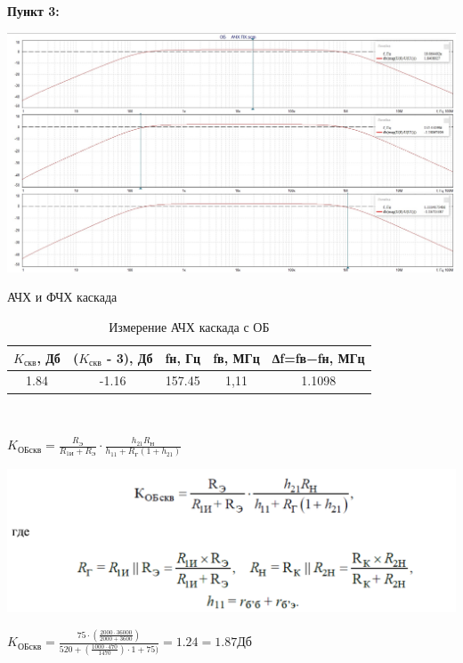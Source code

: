 \documentclass[a4paper,14pt]{extarticle}
\begin{document}
    \newpage 
    \textbf{Пункт 3:}
    \begin{center}
        \includegraphics[scale=0.25]{3.jpg}
    \end{center}
   \begin{center}
        АЧХ и ФЧХ каскада
    \end{center}

    \begin{table}[ht]
        \begin{center}
            \caption{Измерение АЧХ каскада с ОБ}
            \begin{tabular}{ |c|c|c|c|c| }
                \hline
                $K_{\text{скв}}$, Дб & ($K_{\text{скв}}$ - 3), Дб&fн, Гц & fв, МГц & ∆f=fв−fн, МГц \\
                \hline 
                1.84 & -1.16 & 157.45 & 1,11 & 1.1098 \\
                \hline
            \end{tabular}\\
        \end{center}
    \end{table}
    \vspace{-1cm}
    $K_{\text{ОБскв}}=\frac{R_{\text{Э}}}{R_{\text{1И}}+R_{\text{Э}}}\cdot\frac{h_{21}R_{\text{Н}}}{h_{11}+R_{\text{Г}}(1+h_{21})}$
    \begin{center}
        \includegraphics[scale=0.45]{form.png}
    \end{center}
    \begin{center}
        $K_{\text{ОБскв}}=\frac{75\cdot(\frac{2000\cdot36000}{2000+3600})}{520+(\frac{1000\cdot470}{1470})\cdot1+75)} = 1.24 = 1.87\text{Дб}$
    \end{center}
\end{document}
